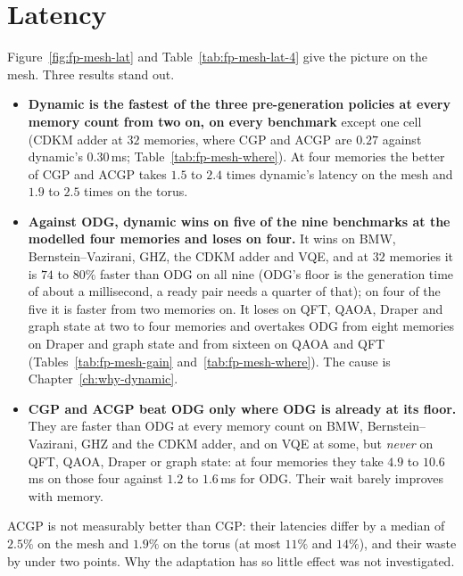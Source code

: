 \section{Latency}


Figure~\ref{fig:fp-mesh-lat} and Table~\ref{tab:fp-mesh-lat-4} give the picture on the mesh. Three results stand out.
\begin{itemize}
  \item \textbf{Dynamic is the fastest of the three pre-generation policies at every memory count from two on, on every benchmark} except one cell (CDKM adder at $32$ memories, where CGP and ACGP are $0.27$ against dynamic's $0.30$\,ms; Table~\ref{tab:fp-mesh-where}).
    At four memories the better of CGP and ACGP takes $1.5$ to $2.4$ times dynamic's latency on the mesh and $1.9$ to $2.5$ times on the torus.
  \item \textbf{Against ODG, dynamic wins on five of the nine benchmarks at the modelled four memories and loses on four.} It wins on BMW, Bernstein--Vazirani, GHZ, the CDKM adder and VQE, and at $32$ memories it is $74$ to $80\%$ faster than ODG on all nine
    (ODG's floor is the generation time of about a millisecond, a ready pair needs a quarter of that); on four of the five it is faster from two memories on.
    It loses on QFT, QAOA, Draper and graph state at two to four memories and overtakes ODG from eight memories on Draper and graph state and from sixteen on QAOA and QFT (Tables~\ref{tab:fp-mesh-gain} and~\ref{tab:fp-mesh-where}).
    The cause is Chapter~\ref{ch:why-dynamic}.
  \item \textbf{CGP and ACGP beat ODG only where ODG is already at its floor.} They are faster than ODG at every memory count on BMW, Bernstein--Vazirani, GHZ and the CDKM adder, and on VQE at some, but \emph{never} on QFT, QAOA, Draper or graph state: at four memories
    they take $4.9$ to $10.6$\,ms on those four against $1.2$ to $1.6$\,ms for ODG. Their wait barely improves with memory.
\end{itemize}
ACGP is not measurably better than CGP: their latencies differ by a median of $2.5\%$ on the mesh and $1.9\%$ on the torus (at most $11\%$ and $14\%$), and their waste by under two points. Why the adaptation has so little effect was not investigated.





